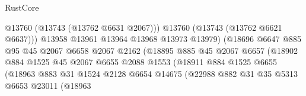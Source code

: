 \begin{lexlean}{RustCore}
\begin{coremodule}
                                            @13760
                                            (@13743 (@13762 @6631 @2067)))
                                          @13760
                                          (@13743 (@13762 @6621 @6637)))
                                        @13958
                                        @13961
                                        @13964
                                        @13968
                                        @13973
                                        @13979)
                                      (@18696
                                        @6647
                                        @885
                                        @95
                                        @45
                                        @2067
                                        @6658
                                        @2067
                                        @2162
                                        (@18895
                                          @885
                                          @45
                                          @2067
                                          @6657
                                          (@18902
                                            @884
                                            @1525
                                            @45
                                            @2067
                                            @6655
                                            @2088
                                            @1553
                                            (@18911
                                              @884
                                              @1525
                                              @6655
                                              (@18963
                                                @883
                                                @31
                                                @1524
                                                @2128
                                                @6654
                                                @14675
                                                (@22988
                                                  @882
                                                  @31
                                                  @35
                                                  @5313
                                                  @6653
                                                  @23011
                                                  (@18963

\end{coremodule}
\end{lexlean}
